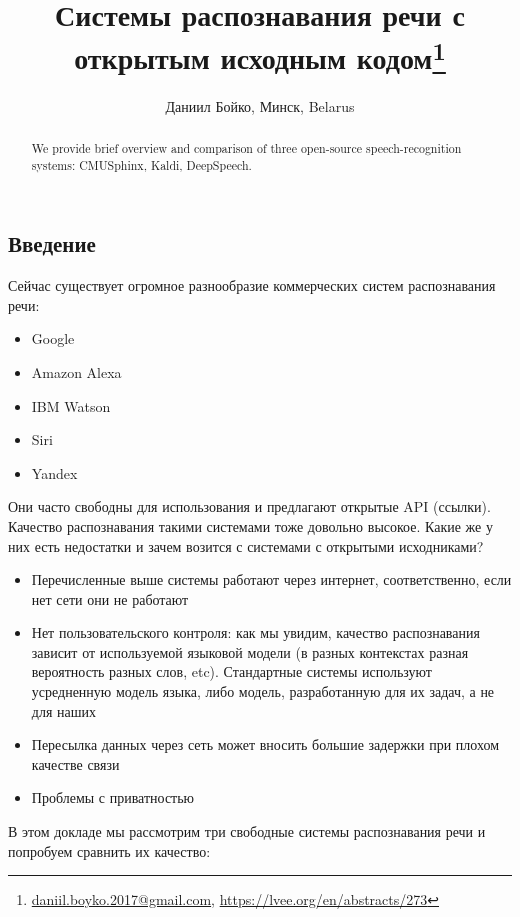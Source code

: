 \documentclass[10pt, a5paper]{article}
\begin{document}
\title{Системы распознавания речи с открытым исходным кодом\footnote{\url{daniil.boyko.2017@gmail.com}, \url{https://lvee.org/en/abstracts/273}}}
\author{Даниил Бойко, Минск, Belarus}
\maketitle
\begin{abstract}
We provide brief overview and comparison of  three open-source speech-recognition systems: CMUSphinx, Kaldi, DeepSpeech.  
\end{abstract}
\subsection*{Введение}

Сейчас существует огромное разнообразие коммерческих систем распознавания речи:

\begin{itemize}
  \item Google
  \item Amazon Alexa
  \item IBM Watson
  \item Siri
  \item Yandex
\end{itemize}

Они часто свободны для использования и предлагают открытые API (ссылки). Качество распознавания такими системами тоже довольно высокое. Какие же у них есть недостатки и зачем возится с системами с открытыми исходниками?

\begin{itemize}
  \item Перечисленные выше системы работают через интернет, соответственно, если нет сети они не работают
  \item Нет пользовательского контроля: как мы увидим, качество распознавания зависит от используемой языковой модели (в разных контекстах разная вероятность разных слов, etc). Стандартные системы используют усредненную модель языка, либо модель, разработанную для их задач, а не для наших
  \item Пересылка данных через сеть может вносить большие задержки при плохом качестве связи
  \item Проблемы с приватностью
\end{itemize}

В этом докладе мы рассмотрим три свободные системы распознавания речи и попробуем сравнить их качество:
\end{document}
